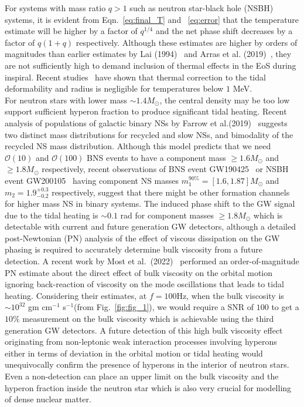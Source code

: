 \documentclass[%
 reprint,
 amsmath,amssymb,
 aps,
]{revtex4-2}
\begin{document}
For systems with mass ratio $q>1$ such as neutron star-black hole (NSBH) systems, it is evident from Eqn.~\eqref{eq:final_T} and ~\eqref{eq:error} that the temperature estimate will be higher by a factor of $q^{1/4}$ and the net phase shift decreases by a factor of $q(1+q)$ respectively. Although these estimates are higher by orders of magnitudes than earlier estimates by Lai (1994)~\cite{Lai_1994} and Arras et al. (2019)~\cite{Arras2019}, they are not sufficiently high to demand inclusion of thermal effects in the EoS during inspiral. Recent studies~\cite{Thermal_2022} have shown that thermal correction to the tidal deformability and radius is negligible for temperatures below $1$ MeV.  \\

 For neutron stars with lower mass $\sim1.4M_{\odot}$, the central density may be too low support sufficient hyperon fraction to produce significant tidal heating. Recent analysis  of populations of galactic binary NSs by Farrow et al.(2019)~\cite{Farrow_2019} suggests two distinct mass distributions for recycled and slow NSs, and bimodality of the recycled NS mass distribution. Although this model predicts that we need $\mathcal{O}(10)$ and $\mathcal{O}(100)$ BNS events to have a component mass $\geq 1.6M_{\odot}$ and $\geq 1.8M_{\odot}$ respectively, recent observations of BNS event GW190425~\cite{GW190425} or NSBH event GW200105~\cite{NSBh} having component NS masses $m_1^{90\%} = [1.6,1.87]M_{\odot}$ and $m_2 = 1.9^{+0.3}_{-0.2}$ respectively, suggest that there might be other formation channels for higher mass NS in binary systems. The induced phase shift to the GW signal due to the tidal heating is $\sim 0.1$ rad for component masses $\geq 1.8M_{\odot}$ which is detectable with current and future generation GW detectors, although a detailed post-Newtonian (PN) analysis of the effect of viscous dissipation on the GW phasing is required to accurately determine bulk viscosity from a future detection. A recent work by Most et al.~(2022)~\cite{Most_2021} performed an order-of-magnitude PN estimate about the direct effect of bulk viscosity on the orbital motion ignoring back-reaction of viscosity on the mode oscillations that leads to tidal heating. Considering their estimates, at $f = 100$Hz, when the bulk viscosity is $\sim 10^{32}$ gm cm$^{-1}$ s$^{-1}$(from Fig.~\ref{fig:fig_1}), we would require a SNR of $100$ to get a $10\%$ measurement on the bulk viscosity which is achievable using the third generation GW detectors. A future detection of this high bulk viscosity effect originating from non-leptonic weak interaction processes involving hyperons either in terms of deviation in the orbital motion or tidal heating would unequivocally confirm the presence of hyperons in the interior of neutron stars. Even a non-detection can place an upper limit on the bulk viscosity and the hyperon fraction inside the neutron star which is also very crucial for  modelling of dense nuclear matter. \\
\end{document}
